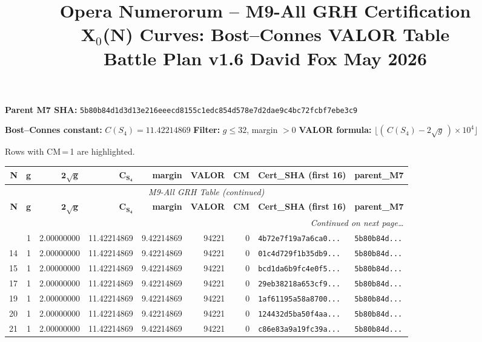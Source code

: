 \documentclass[10pt]{article}
\title{\textbf{Opera Numerorum -- M9-All GRH Certification}\\
\large X$_0$(N) Curves: Bost--Connes VALOR Table\\
\normalsize Battle Plan v1.6 \quad David Fox \quad May 2026}
\date{}
\begin{document}
\maketitle
\thispagestyle{empty}

\noindent\textbf{Parent M7 SHA:}
\texttt{5b80b84d1d3d13e216eeecd8155c1edc854d578e7d2dae9c4bc72fcbf7ebe3c9}

\medskip
\noindent\textbf{Bost--Connes constant:} $C(S_4) = 11.42214869$
\quad\textbf{Filter:} $g \leq 32$, margin $> 0$
\quad\textbf{VALOR formula:} $\lfloor (\,C(S_4) - 2\sqrt{g}\,) \times 10^4 \rfloor$

\medskip
\noindent Rows with \textcolor{cmpink}{CM\,=\,1} are highlighted.

\bigskip

\begin{longtable}{rrrrrrrll}
\toprule
\textbf{N} & \textbf{g} & $\mathbf{2\sqrt{g}}$ & $\mathbf{C_{S_4}}$ &
\textbf{margin} & \textbf{VALOR} & \textbf{CM} &
\textbf{Cert\_SHA (first 16)} & \textbf{parent\_M7} \\
\midrule
\endfirsthead
\multicolumn{9}{c}{\small\emph{M9-All GRH Table (continued)}} \\
\toprule
\textbf{N} & \textbf{g} & $\mathbf{2\sqrt{g}}$ & $\mathbf{C_{S_4}}$ &
\textbf{margin} & \textbf{VALOR} & \textbf{CM} &
\textbf{Cert\_SHA (first 16)} & \textbf{parent\_M7} \\
\midrule
\endhead
\midrule
\multicolumn{9}{r}{\small\emph{Continued on next page\ldots}} \\
\endfoot
\bottomrule
\endlastfoot
  11 & 1 & 2.00000000 & 11.42214869 & 9.42214869 & 94221 & 0 & \texttt{4b72e7f19a7a6ca0...} & \texttt{5b80b84d...} \\
  14 & 1 & 2.00000000 & 11.42214869 & 9.42214869 & 94221 & 0 & \texttt{01c4d729f1b35db9...} & \texttt{5b80b84d...} \\
  15 & 1 & 2.00000000 & 11.42214869 & 9.42214869 & 94221 & 0 & \texttt{bcd1da6b9fc4e0f5...} & \texttt{5b80b84d...} \\
  17 & 1 & 2.00000000 & 11.42214869 & 9.42214869 & 94221 & 0 & \texttt{29eb38218a653cf9...} & \texttt{5b80b84d...} \\
  19 & 1 & 2.00000000 & 11.42214869 & 9.42214869 & 94221 & 0 & \texttt{1af61195a58a8700...} & \texttt{5b80b84d...} \\
  20 & 1 & 2.00000000 & 11.42214869 & 9.42214869 & 94221 & 0 & \texttt{124432d5ba50f4aa...} & \texttt{5b80b84d...} \\
  21 & 1 & 2.00000000 & 11.42214869 & 9.42214869 & 94221 & 0 & \texttt{c86e83a9a19fc39a...} & \texttt{5b80b84d...} \\

\end{longtable}
\end{document}
